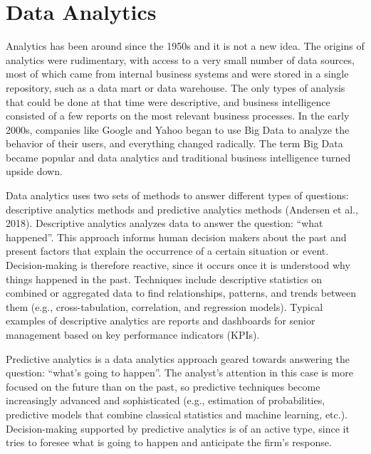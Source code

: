 \documentclass[
  letterpaper,
  DIV=11,
  numbers=noendperiod]{scrreprt}
\begin{document}
\hypertarget{data-analytics}{%
\section{Data Analytics}\label{data-analytics}}

Analytics has been around since the 1950s and it is not a new idea. The
origins of analytics were rudimentary, with access to a very small
number of data sources, most of which came from internal business
systems and were stored in a single repository, such as a data mart or
data warehouse. The only types of analysis that could be done at that
time were descriptive, and business intelligence consisted of a few
reports on the most relevant business processes. In the early 2000s,
companies like Google and Yahoo began to use Big Data to analyze the
behavior of their users, and everything changed radically. The term Big
Data became popular and data analytics and traditional business
intelligence turned upside down.

Data analytics uses two sets of methods to answer different types of
questions: descriptive analytics methods and predictive analytics
methods (Andersen et al., 2018). Descriptive analytics analyzes data to
answer the question: ``what happened''. This approach informs human
decision makers about the past and present factors that explain the
occurrence of a certain situation or event. Decision-making is therefore
reactive, since it occurs once it is understood why things happened in
the past. Techniques include descriptive statistics on combined or
aggregated data to find relationships, patterns, and trends between them
(e.g., cross-tabulation, correlation, and regression models). Typical
examples of descriptive analytics are reports and dashboards for senior
management based on key performance indicators (KPIs).

Predictive analytics is a data analytics approach geared towards
answering the question: ``what's going to happen''. The analyst's
attention in this case is more focused on the future than on the past,
so predictive techniques become increasingly advanced and sophisticated
(e.g., estimation of probabilities, predictive models that combine
classical statistics and machine learning, etc.). Decision-making
supported by predictive analytics is of an active type, since it tries
to foresee what is going to happen and anticipate the firm's response.
\end{document}
